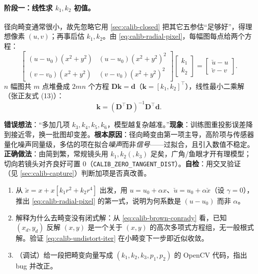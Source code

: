 \paragraph{阶段一：线性求 $k_1,k_2$ 初值。}
径向畸变通常很小，故先忽略它用 \cref{sec:calib-closed} 把其它五参估“足够好”，得理想像素 $(u,v)$；再事后估 $k_1,k_2$。由 \cref{eq:calib-radial-pixel}，每幅图每点给两个方程\cite{zhang2000calibration}：
\begin{equation}
  \begin{bmatrix}
  (u-u_0)(x^2+y^2) & (u-u_0)(x^2+y^2)^2\\
  (v-v_0)(x^2+y^2) & (v-v_0)(x^2+y^2)^2
  \end{bmatrix}
  \begin{bmatrix}k_1\\k_2\end{bmatrix}
  =\begin{bmatrix}\breve u-u\\ \breve v-v\end{bmatrix}.
\end{equation}
$n$ 幅图共 $m$ 点堆叠成 $2mn$ 个方程 $\mathbf{D}\mathbf{k}=\mathbf{d}$（$\mathbf{k}=[k_1,k_2]^\top$），线性最小二乘解（张正友式 (13)\cite{zhang2000calibration}）：
\begin{equation}
  \mathbf{k}=(\mathbf{D}^\top\mathbf{D})^{-1}\mathbf{D}^\top\mathbf{d}.
  \label{eq:calib-radial-linear}
\end{equation}

\begin{pitfall}
\textbf{错误想法}：“多加几项 $k_3,k_4,k_5,k_6$，模型越复杂越准。”\textbf{现象}：训练图重投影误差降到接近零，换一批图却变差。\textbf{根本原因}：径向畸变由第一项主导，高阶项与传感器量化噪声同量级，多估的项在拟合\emph{噪声}而非\emph{信号}——过拟合，且引入数值不稳定\cite{zhang2000calibration}。\textbf{正确做法}：由简到繁，常规镜头用 $k_1,k_2(,k_3)$ 足矣，广角/鱼眼才开有理模型；切向若镜头对齐良好可置 $0$（\texttt{CALIB\_ZERO\_TANGENT\_DIST}）。\textbf{自检}：用交叉验证（见 \cref{sec:calib-capture}）判断加项是否真改善。
\end{pitfall}

\begin{practice}[练习]
\begin{enumerate}
  \item 从 $\breve x=x+x[k_1r^2+k_2r^4]$ 出发，用 $u=u_0+\alpha x$、$\breve u=u_0+\alpha\breve x$（设 $\gamma=0$），推出 \cref{eq:calib-radial-pixel} 的第一式，说明为何系数是 $(u-u_0)$ 而非 $\alpha$。
  \item 解释为什么去畸变没有闭式解：从 \cref{eq:calib-brown-conrady} 看，已知 $(x_d,y_d)$ 反解 $(x,y)$ 是一个关于 $(x,y)$ 的高次多项式方程组，无一般根式解。验证 \cref{eq:calib-undistort-iter} 在小畸变下一步即近似收敛。
  \item （调试）给一段把畸变向量写成 $(k_1,k_2,k_3,p_1,p_2)$ 的 OpenCV 代码，指出 bug 并改正。
\end{enumerate}
\end{practice}

